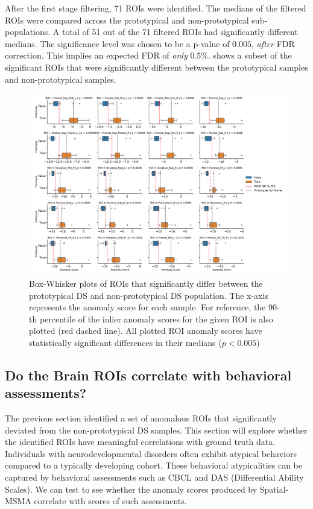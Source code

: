 After the first stage filtering, 71 ROIs were identified. The medians of the filtered ROIs were compared across the prototypical and non-prototypical sub-populations. A total of 51 out of the 71 filtered ROIs had significantly different medians. The significance level was chosen to be a p-value of $0.005$, \textit{after} FDR correction. This implies an expected FDR of \textit{only} $0.5\%$.  shows a subset of the significant ROIs that were significantly different between the prototypical samples and non-prototypical samples.

\begin{figure}[tbhp]
\centering
\includegraphics[width=\textwidth]{figures/roi_boxplot-1.pdf}
\caption{Box-Whisker plots of ROIs that significantly differ between the prototypical DS and non-prototypical DS population. The x-axis represents the anomaly score for each sample. For reference, the 90-th percentile of the inlier anomaly scores for the given ROI is also plotted (red dashed line). All plotted ROI anomaly scores have statistically significant differences in their medians ($p < 0.005$) }
\label{fig:roi-box-ds}
\end{figure}

\subsection*{Do the Brain ROIs correlate with behavioral assessments?}

The previous section identified a set of anomalous ROIs that significantly deviated from the non-prototypical DS samples. This section will explore whether the identified ROIs have meaningful correlations with ground truth data. Individuals with neurodevelopmental disorders often exhibit atypical behaviors compared to a typically developing cohort. These behavioral atypicalities can be captured by behavioral assessments such as CBCL and DAS (Differential Ability Scales). We can test to see whether the anomaly scores produced by Spatial-MSMA correlate with scores of such assessments. 

